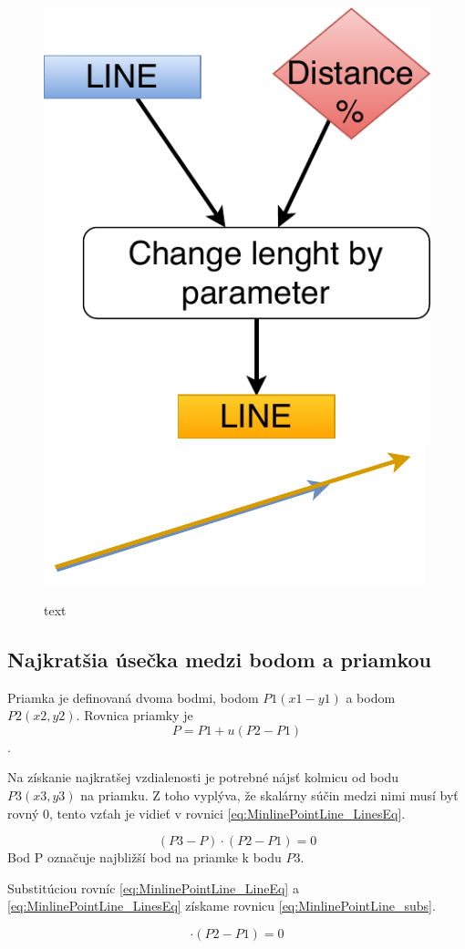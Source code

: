 \begin{figure}[H]
	\centering
	\includegraphics[height=0.3\textwidth]{obrazky-figures/Diagram/Line/DP Navrh operacii-1D - LineChangeLength.pdf}
	\includegraphics[]{obrazky-figures/Diagram/Draw/2Line/DP Navrh operacii-1D - LineChangeLength.pdf}
	\caption{text}
	\label{fig:1}
\end{figure}

\subsection{Najkratšia úsečka medzi bodom a priamkou}\label{sec:najkratsiauseckaBP}
Priamka je definovaná dvoma bodmi, bodom $P1(x1-y1)$ a bodom $P2(x2,y2)$. 
Rovnica priamky je 
\begin{equation}
    P = P1 + u(P2-P1)
    \label{eq:MinlinePointLine_LineEq}
\end{equation}. 

Na získanie najkratšej vzdialenosti je potrebné nájsť kolmicu od bodu $P3(x3,y3)$ na priamku. Z toho vyplýva, že skalárny súčin medzi nimi musí byť rovný 0, tento vzťah je vidieť v rovnici \ref{eq:MinlinePointLine_LinesEq}.

\begin{equation}
    (P3-P)\cdot(P2-P1) =0 
    \label{eq:MinlinePointLine_LinesEq}
\end{equation}
Bod P označuje najbližší bod na priamke k bodu $P3$.

Substitúciou rovníc \ref{eq:MinlinePointLine_LineEq} a \ref{eq:MinlinePointLine_LinesEq} získame rovnicu \ref{eq:MinlinePointLine_subs}.

\begin{equation}
[P3 - P1 - u(P2-P1)] \cdot (P2 - P1) = 0
    \label{eq:MinlinePointLine_subs}
\end{equation}

